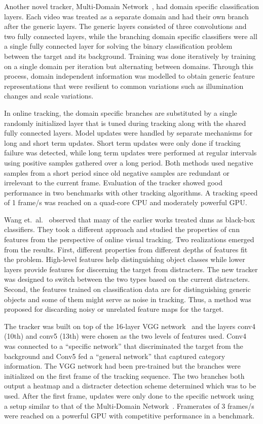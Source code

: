 Another novel tracker, Multi-Domain Network~\cite{MDNET}, had domain specific classification
layers. Each video was treated as a separate domain and had their own branch after the
generic layers. The generic layers consisted of three convolutions and two fully connected
layers, while the branching domain specific classifiers were all a single fully connected
layer for solving the binary classification problem between the target and its background.
Training was done iteratively by training on a single domain per iteration but alternating
between domains. Through this process, domain independent information was modelled to
obtain generic feature representations that were resilient to common variations such as
illumination changes and scale variations.

In online tracking, the domain specific branches are substituted by a single randomly
initialized layer that is tuned during tracking along with the shared fully connected
layers. Model updates were handled by separate mechanisms for long and short term updates.
Short term updates were only done if tracking failure was detected, while long term updates
were performed at regular intervals using positive samples gathered over a long period.
Both methods used negative samples from a short period since old negative samples are
redundant or irrelevant to the current frame. Evaluation of the tracker showed good
performance in two benchmarks with other tracking algorithms. A tracking speed of
1 frame/s was reached on a quad-core CPU and moderately powerful GPU.

Wang et.~al.~\cite{FCN_TRACK_2} observed that many of the earlier works treated \ac{dnn}s
as black-box classifiers. They took a different approach and studied the properties of
\ac{cnn} features from the perspective of online visual tracking. Two realizations
emerged from the results. First, different properties from different depths of features
fit the problem. High-level features help distinguishing object classes while lower
layers provide features for discerning the target from distracters. The new tracker was
designed to switch between the two types based on the current distracters. Second, the
features trained on classification data are for distinguishing generic objects and some
of them might serve as noise in tracking. Thus, a method was proposed for discarding
noisy or unrelated feature maps for the target.

The tracker was built on top of the 16-layer VGG network~\cite{VGG} and the layers
conv4 (10th) and conv5 (13th) were chosen as the two
levels of features used. Conv4 was connected to a ``specific network''
that discriminated the target from the background and Conv5 fed a
``general network'' that captured category information. The VGG network had been
pre-trained but the branches were initialized on the first frame of the tracking
sequence. The two branches both output a heatmap and a distracter detection scheme
determined which was to be used. After the first frame, updates were only done to
the specific network using a setup similar to that of the Multi-Domain Network~\cite{MDNET}.
Framerates of 3 frames/s were reached on a powerful GPU with competitive performance in
a benchmark.

